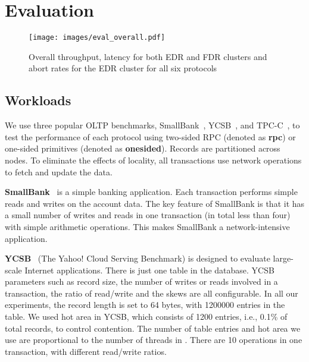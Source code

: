 \vspace{-2mm}
\section{Evaluation}


\begin{figure*}[t!]
    \centering
    \texttt{[image: images/eval\_overall.pdf]}
    \vspace{-0.4cm}
    \caption{Overall throughput, latency for both EDR and FDR clusters and abort rates for the EDR cluster for all six protocols}
    \vspace{-0.7cm}
    \label{fig:eval_overall}
\end{figure*}

\subsection{Workloads}

We use three popular OLTP benchmarks, SmallBank~\cite{SmallBank}, YCSB~\cite{cooper2010benchmarking}, and TPC-C~\cite{TPC-C}, to test the performance of each protocol using two-sided RPC (denoted as \textbf{rpc}) or one-sided primitives (denoted as \textbf{onesided}). Records are partitioned across nodes. %
To eliminate the effects of locality, 
all transactions 
use network operations to fetch and update the data. 

\textbf{SmallBank}~\cite{SmallBank} is a simple banking application. Each transaction performs simple reads and writes on the account data. The key feature of SmallBank is that it has a small number of writes and reads in one transaction (in total less than four) with 
simple arithmetic operations.
This makes SmallBank a network-intensive application. %

\textbf{YCSB}~\cite{cooper2010benchmarking} (The Yahoo! Cloud Serving Benchmark) is designed to evaluate large-scale Internet applications. There is just one table in the database. YCSB parameters such as
record size, the number of writes or reads involved in a transaction, the ratio of read/write and the skews are all configurable. In all our experiments, the record length is set to 64 bytes, with 1200000 entries in the table. We used hot area in YCSB, which consists of 1200 entries, i.e., 0.1\% of total records, to control contention. The number of table entries and hot area we use are proportional to the number of threads in \projectname. There are 10 operations in one transaction, with different read/write ratios.%


